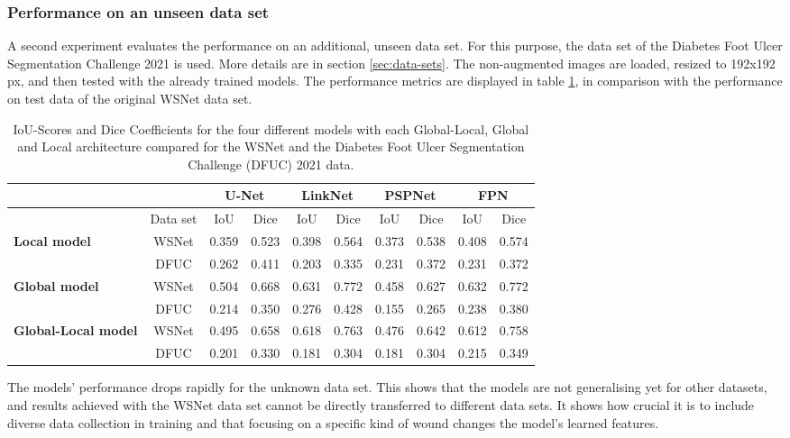 \subsubsection{Performance on an unseen data set}

A second experiment evaluates the performance on an additional, unseen data set. For this purpose, the data set of the Diabetes Foot Ulcer Segmentation Challenge 2021 \cite{Wang2020} is used. More details are in section \ref{sec:data-sets}. The non-augmented images are loaded, resized to 192x192\,px, and then tested with the already trained models. The performance metrics are displayed in table \ref{table:dataset-comparison}, in comparison with the performance on test data of the original WSNet data set.


\begin{table}[htb!]
	\centering
	\begin{tabular}{l | c ||c | c || c | c || c | c || c | c||}
	& & \multicolumn{2}{|c||}{U-Net} & \multicolumn{2}{|c||}{LinkNet} & \multicolumn{2}{|c||}{PSPNet} & \multicolumn{2}{|c||}{FPN} \\
	\hline
	& Data set & IoU & Dice & IoU & Dice & IoU & Dice & IoU & Dice \\
	\hline\hline
	\multirow{2}{*}{\textbf{Local model}} & WSNet & 0.359 & 0.523 & 0.398 & 0.564 & 0.373 & 0.538 & 0.408 & 0.574 \\
	& DFUC & 0.262 & 0.411 & 0.203 & 0.335 & 0.231 & 0.372 & 0.231 & 0.372\\
	\hline
	\multirow{2}{*}{\textbf{Global model}} & WSNet & 0.504 & 0.668 & 0.631 & 0.772 & 0.458 & 0.627 & 0.632 & 0.772 \\
	& DFUC & 0.214 & 0.350 & 0.276 & 0.428 & 0.155 & 0.265 & 0.238 & 0.380\\
	\hline
	\multirow{2}{*}{\textbf{Global-Local model}} & WSNet & 0.495 & 0.658 & 0.618 & 0.763 & 0.476 & 0.642 & 0.612 & 0.758\\
	& DFUC & 0.201 & 0.330 & 0.181 & 0.304 & 0.181 & 0.304 & 0.215 & 0.349\\
	\end{tabular}
	\caption{IoU-Scores and Dice Coefficients for the four different models with each Global-Local, Global and Local architecture compared for the WSNet and the Diabetes Foot Ulcer Segmentation Challenge (DFUC) 2021 data.}
	\label{table:dataset-comparison}
\end{table}

The models' performance drops rapidly for the unknown data set. This shows that the models are not generalising yet for other datasets, and results achieved with the WSNet data set cannot be directly transferred to different data sets. It shows how crucial it is to include diverse data collection in training and that focusing on a specific kind of wound changes the model's learned features.

